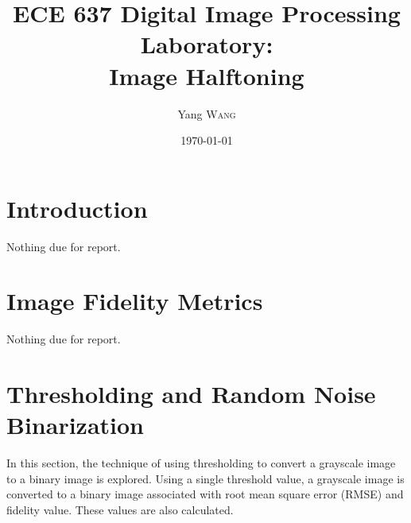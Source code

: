 \documentclass{article}
\title{ECE 637 Digital Image Processing Laboratory: \\ Image Halftoning} %
\author{Yang \textsc{Wang}} %
\date{\today} %
\begin{document}
\maketitle %


\section{Introduction}

Nothing due for report.


\section{Image Fidelity Metrics}

Nothing due for report.


\section{Thresholding and Random Noise Binarization}

In this section, the technique of using thresholding to convert a grayscale
image to a binary image is explored. Using a single threshold value, a grayscale
image is converted to a binary image associated with root mean square error
(RMSE) and fidelity value. These values are also calculated.
\end{document}
